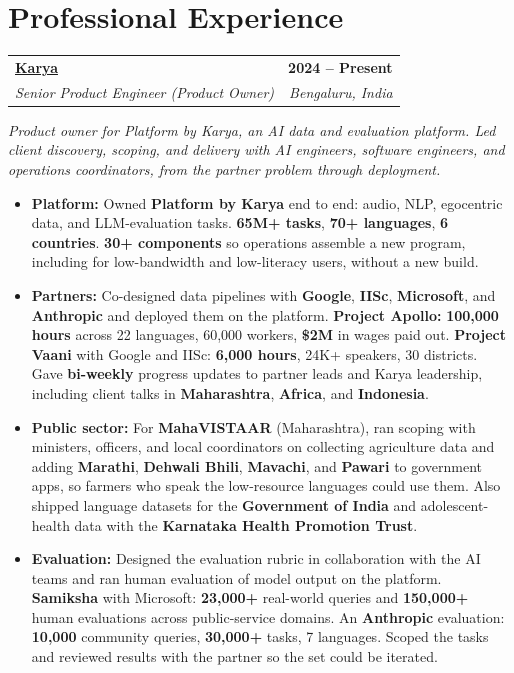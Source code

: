 \documentclass[letterpaper,10.5pt]{article}
\makeatletter
\newcommand{\entry}[4]{%
  \begin{tabularx}{\linewidth}{@{}X@{}r@{}}
    \textbf{#1} & \textbf{#4} \\
    \textit{#2} & \textit{#3} \\
  \end{tabularx}%
  \vspace{1pt}
}
\makeatother
\begin{document}
\section{Professional Experience}

\entry{\href{https://karya.in}{Karya}}{Senior Product Engineer (Product Owner)}{Bengaluru, India}{2024 -- Present}
{\small\textit{Product owner for Platform by Karya, an AI data and evaluation platform. Led client discovery, scoping, and delivery with AI engineers, software engineers, and operations coordinators, from the partner problem through deployment.}}
\begin{itemize}
  \item \textbf{Platform:} Owned \textbf{Platform by Karya} end to end: audio, NLP, egocentric data, and LLM-evaluation tasks. \textbf{65M+ tasks}, \textbf{70+ languages}, \textbf{6 countries}. \textbf{30+ components} so operations assemble a new program, including for low-bandwidth and low-literacy users, without a new build.
  \item \textbf{Partners:} Co-designed data pipelines with \textbf{Google}, \textbf{IISc}, \textbf{Microsoft}, and \textbf{Anthropic} and deployed them on the platform. \textbf{Project Apollo:} \textbf{100,000 hours} across 22 languages, 60,000 workers, \textbf{\$2M} in wages paid out. \textbf{Project Vaani} with Google and IISc: \textbf{6,000 hours}, 24K+ speakers, 30 districts. Gave \textbf{bi-weekly} progress updates to partner leads and Karya leadership, including client talks in \textbf{Maharashtra}, \textbf{Africa}, and \textbf{Indonesia}.
  \item \textbf{Public sector:} For \textbf{MahaVISTAAR} (Maharashtra), ran scoping with ministers, officers, and local coordinators on collecting agriculture data and adding \textbf{Marathi}, \textbf{Dehwali Bhili}, \textbf{Mavachi}, and \textbf{Pawari} to government apps, so farmers who speak the low-resource languages could use them. Also shipped language datasets for the \textbf{Government of India} and adolescent-health data with the \textbf{Karnataka Health Promotion Trust}.
  \item \textbf{Evaluation:} Designed the evaluation rubric in collaboration with the AI teams and ran human evaluation of model output on the platform. \textbf{Samiksha} with Microsoft: \textbf{23,000+} real-world queries and \textbf{150,000+} human evaluations across public-service domains. An \textbf{Anthropic} evaluation: \textbf{10,000} community queries, \textbf{30,000+} tasks, 7 languages. Scoped the tasks and reviewed results with the partner so the set could be iterated.

\end{itemize}
\end{document}
